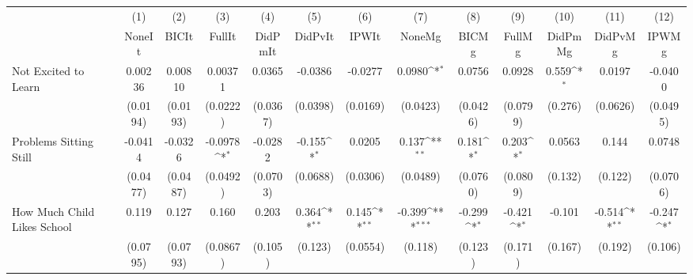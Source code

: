 {
\def\sym#1{\ifmmode^{#1}\else\(^{#1}\)\fi}
\begin{tabular}{l*{12}{c}}
\toprule
            &\multicolumn{1}{c}{(1)}&\multicolumn{1}{c}{(2)}&\multicolumn{1}{c}{(3)}&\multicolumn{1}{c}{(4)}&\multicolumn{1}{c}{(5)}&\multicolumn{1}{c}{(6)}&\multicolumn{1}{c}{(7)}&\multicolumn{1}{c}{(8)}&\multicolumn{1}{c}{(9)}&\multicolumn{1}{c}{(10)}&\multicolumn{1}{c}{(11)}&\multicolumn{1}{c}{(12)}\\
            &\multicolumn{1}{c}{NoneIt}&\multicolumn{1}{c}{BICIt}&\multicolumn{1}{c}{FullIt}&\multicolumn{1}{c}{DidPmIt}&\multicolumn{1}{c}{DidPvIt}&\multicolumn{1}{c}{IPWIt}&\multicolumn{1}{c}{NoneMg}&\multicolumn{1}{c}{BICMg}&\multicolumn{1}{c}{FullMg}&\multicolumn{1}{c}{DidPmMg}&\multicolumn{1}{c}{DidPvMg}&\multicolumn{1}{c}{IPWMg}\\
\midrule
Not Excited to Learn&     0.00236         &     0.00810         &     0.00371         &      0.0365         &     -0.0386         &     -0.0277         &      0.0980\sym{*}  &      0.0756         &      0.0928         &       0.559\sym{*}  &      0.0197         &     -0.0400         \\
            &    (0.0194)         &    (0.0193)         &    (0.0222)         &    (0.0367)         &    (0.0398)         &    (0.0169)         &    (0.0423)         &    (0.0426)         &    (0.0799)         &     (0.276)         &    (0.0626)         &    (0.0495)         \\
\addlinespace
Problems Sitting Still&     -0.0414         &     -0.0326         &     -0.0978\sym{*}  &     -0.0282         &      -0.155\sym{*}  &      0.0205         &       0.137\sym{**} &       0.181\sym{*}  &       0.203\sym{*}  &      0.0563         &       0.144         &      0.0748         \\
            &    (0.0477)         &    (0.0487)         &    (0.0492)         &    (0.0703)         &    (0.0688)         &    (0.0306)         &    (0.0489)         &    (0.0760)         &    (0.0809)         &     (0.132)         &     (0.122)         &    (0.0706)         \\
\addlinespace
How Much Child Likes School&       0.119         &       0.127         &       0.160         &       0.203         &       0.364\sym{**} &       0.145\sym{**} &      -0.399\sym{***}&      -0.299\sym{*}  &      -0.421\sym{*}  &      -0.101         &      -0.514\sym{**} &      -0.247\sym{*}  \\
            &    (0.0795)         &    (0.0793)         &    (0.0867)         &     (0.105)         &     (0.123)         &    (0.0554)         &     (0.118)         &     (0.123)         &     (0.171)         &     (0.167)         &     (0.192)         &     (0.106)         \\

\end{tabular}}

